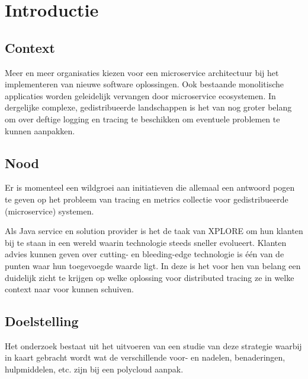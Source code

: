 
\section{Introductie} %
\label{sec:introductie}

\subsection{Context}
Meer en meer organisaties kiezen voor een microservice
architectuur bij het implementeren van nieuwe software
oplossingen. Ook bestaande monolitische applicaties
worden geleidelijk vervangen door microservice
ecosystemen. In dergelijke complexe, gedistribueerde
landschappen is het van nog groter belang om over deftige
logging en tracing te beschikken om eventuele problemen
te kunnen aanpakken.

\subsection{Nood}
Er is momenteel een wildgroei aan initiatieven die allemaal
een antwoord pogen te geven op het probleem van tracing
en metrics collectie voor gedistribueerde (microservice)
systemen.

Als Java service en solution provider is het de taak van XPLORE om
hun klanten bij te staan in een wereld waarin technologie
steeds sneller evolueert. Klanten advies kunnen geven over
cutting- en bleeding-edge technologie is één van de punten
waar hun toegevoegde waarde ligt.
In deze is het voor hen van belang een duidelijk zicht te
krijgen op welke oplossing voor distributed tracing ze in
welke context naar voor kunnen schuiven. 

\subsection{Doelstelling}
Het onderzoek bestaat uit het uitvoeren van een studie van deze 
strategie waarbij in kaart gebracht wordt wat de verschillende 
voor- en nadelen, benaderingen, hulpmiddelen, etc. zijn bij een 
polycloud aanpak.


